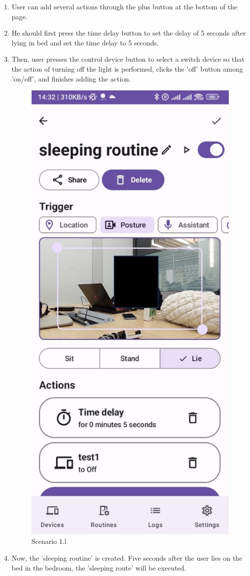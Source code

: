 \begin{enumerate}
\begin{enumerate}
        \item User can add several actions through the plus button at the bottom of the page. \\
        \item He should first press the time delay button to set the delay of 5 seconds after lying in bed and set the time delay to 5 seconds. \\
        \item Then, user presses the control device button to select a switch device so that the action of turning off the light is performed, clicks the 'off' button among 'on/off', and finishes adding the action.\\
        \begin{figure}
            \centering
            \includegraphics[width=0.5\linewidth]{imgs//usercase/usercase_scenario1_12.jpg}
            \caption{Scenario 1.l}
            \label{fig:enter-label}
        \end{figure}
        \item Now, the 'sleeping routine' is created. Five seconds after the user lies on the bed in the bedroom, the 'sleeping route' will be executed.\\
        \begin{figure}

\end{figure}
\end{enumerate}
\end{enumerate}
